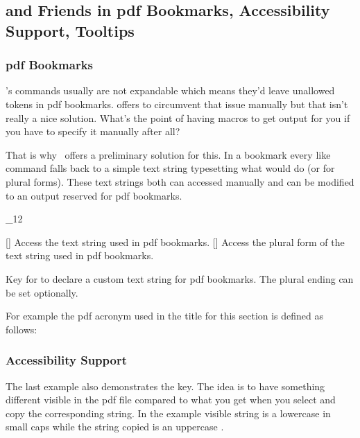 \documentclass[load-preamble+]{cnltx-doc}
\makeatletter
\renewenvironment{commands}
  {%
    \cnltx@set@catcode_{12}%
    \let\command\cnltx@command
    \cnltxlist
  }
  {\endcnltxlist}
\makeatother
\begin{document}
\subsection{ and Friends in \acs*{pdf} Bookmarks, Accessibility
  Support, Tooltips}
\subsubsection{\acs*{pdf} Bookmarks}
\acro's commands usually are not expandable which means they'd leave unallowed
tokens in \acs{pdf} bookmarks.   offers  to
circumvent that issue manually but that isn't really a nice solution.  What's
the point of having macros to get output for you if you have to specify it
manually after all?

That is why \acro\ offers a preliminary solution for this.  In a bookmark
every  like command falls back to a simple text string typesetting what
 would do (or  for plural forms).  These text strings both
can accessed manually and can be modified to an output reserved for \acs{pdf}
bookmarks.

\begin{commands}
  \command{acpdfstring}[]
    Access the text string used in \acs{pdf} bookmarks.
  \command{acpdfstringplural}[]
    Access the plural form of the text string used in \acs{pdf} bookmarks.
\end{commands}
\begin{options}
    Key for  to declare a custom text string for \acs{pdf}
    bookmarks.  The plural ending can be set optionally.
\end{options}

For example the \acs{pdf} acronym used in the title for this section is defined
as follows:
\begin{sourcecode}
\end{sourcecode}

\subsubsection{Accessibility Support}

The last example also demonstrates the  key.  The idea is to
have something different visible in the \acs{pdf} file compared to what you
get when you select and copy the corresponding string.  In the example visible
string is a lowercase  in small caps while the string copied is an
uppercase .
\end{document}
